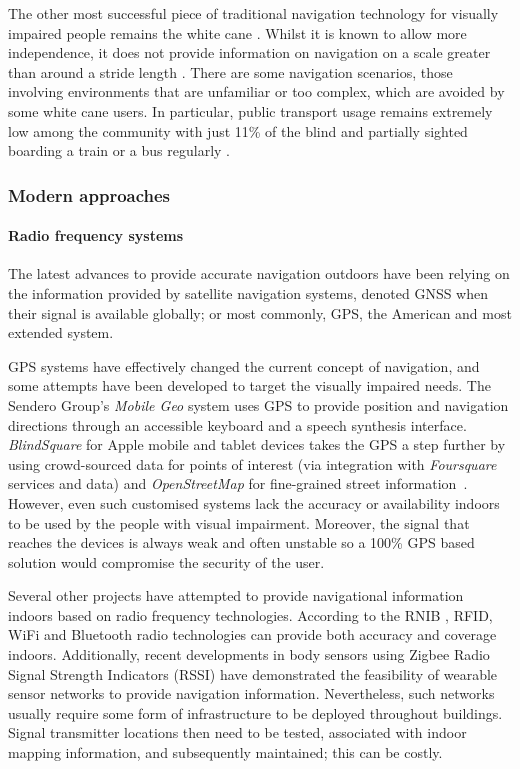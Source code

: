 The other most successful piece of traditional navigation technology for visually impaired people remains the white cane \citep{roentgen2008inventory}.  Whilst it is known to allow more independence, it does not provide information on navigation on a scale greater than around a stride length \citep{maidenbaum2013increasing}. There are some navigation scenarios, those involving environments that are unfamiliar or too complex, which are avoided by some white cane users. In particular, public transport usage remains extremely low among the community with just 11\% of the blind and partially sighted boarding a train or a bus regularly \citep{Pey2006}.

\subsubsection{Modern approaches}
\label{sec:modernapproaches}
\paragraph{Radio frequency systems}

The latest advances to provide accurate navigation outdoors have been relying on the information provided by satellite navigation systems, denoted GNSS when their signal is available globally; or most commonly, GPS, the American and most extended system.

GPS systems have effectively changed the current concept of navigation, and some attempts have been developed to target the visually impaired needs. The Sendero Group's {\it Mobile Geo} \citep{senderoSeeingEye} system uses GPS to provide position and navigation directions through an accessible keyboard and a speech synthesis interface. {\it BlindSquare} for Apple mobile and tablet devices takes the GPS a step further by using crowd-sourced data for points of interest (via integration with {\it Foursquare} services and data) and {\it OpenStreetMap} for fine-grained street information~\citep{blindSquare}. However, even such customised systems lack the accuracy or availability indoors to be used by the people with visual impairment. Moreover, the signal that reaches the devices is always weak and often unstable so a 100\% GPS based solution would compromise the security of the user.

Several other projects have attempted to provide navigational information indoors based on radio frequency technologies. According to the RNIB \citep{Worsfold2010}, RFID, WiFi and Bluetooth radio technologies can provide both accuracy and coverage indoors. Additionally, recent developments in body sensors using Zigbee Radio Signal Strength Indicators (RSSI) \citep{dong2012mapping} have demonstrated the feasibility of wearable sensor networks to provide navigation information. Nevertheless, such networks usually require some form of infrastructure to be deployed throughout buildings. Signal transmitter locations then need to be tested, associated with indoor mapping information, and subsequently maintained; this can be costly.

